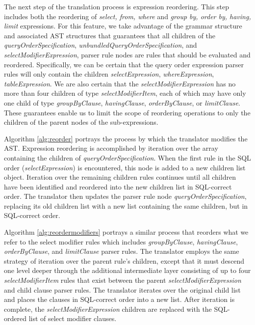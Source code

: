 The next step of the translation process is expression reordering. This step includes both the reordering of \emph{select, from, where} and \emph{group by, order by, having, limit} expressions. For this feature, we take advantage of the grammar structure and associated AST structures that guarantees that all children of the \emph{queryOrderSpecification}, \emph{unbundledQueryOrderSpecification}, and \emph{selectModifierExpression}, parser rule nodes are rules that should be evaluated and reordered. Specifically, we can be certain that the query order expression parser rules will only contain the children \emph{selectExpression}, \emph{whereExpression}, \emph{tableExpression}. We are also certain that the \emph{selectModifierExpression} has no more than four children of type \emph{selectModifierItem}, each of which may have only one child of type \emph{groupByClause}, \emph{havingClause}, \emph{orderByClause}, or \emph{limitClause}. These guarantees enable us to limit the scope of reordering operations to only the children of the parent nodes of the sub-expressions. 

Algorithm \ref{alg:reorder} portrays the process by which the translator modifies the AST. Expression reordering is accomplished by iteration over the array containing the children of \emph{queryOrderSpecification}. When the first rule in the SQL order (\emph{selectExpression}) is encountered, this node is added to a new children list object. Iteration over the remaining children rules continues until all children have been identified and reordered into the new children list in SQL-correct order. The translator then updates the parser rule node \emph{queryOrderSpecification}, replacing its old children list with a new list containing the same children, but in SQL-correct order.

\ReorderParseTreeAlgorithm

Algorithm \ref{alg:reordermodifiers} portrays a similar process that reorders what we refer to the select modifier rules which includes \emph{groupByClause}, \emph{havingClause}, \emph{orderByClause}, and \emph{limitClause} parser rules. The translator employs the same strategy of iteration over the parent rule's children, except that it must descend one level deeper through the additional intermediate layer consisting of up to four \emph{selectModifierItem} rules that exist between the parent \emph{selectModifierExpression} and child clause parser rules. The translator iterates over the original child list and places the clauses in SQL-correct order into a new list. After iteration is complete, the \emph{selectModifierExpression} children are replaced with the SQL-ordered list of select modifier clauses.

